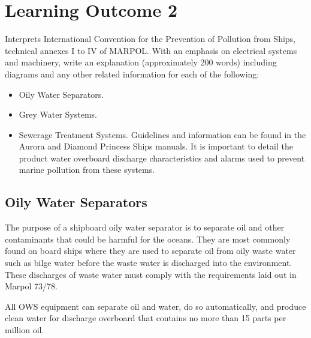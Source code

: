 \documentclass[11pt,a4paper]{article}
\begin{document}
\section{Learning Outcome 2}
\begin{tcolorbox}[colback=red!5!white,colframe=red!75!black,title=\textbf{Demonstrate knowledge of safe disposal of waste materials}]
Interprets International Convention for the Prevention of Pollution from Ships, technical annexes I to IV of MARPOL.
With an emphasis on electrical systems and machinery, write an explanation (approximately 200 words) including diagrams and any other related information for each of the following:
\begin{itemize}
\item Oily Water Separators.
\item Grey Water Systems.
\item Sewerage Treatment Systems.
Guidelines and information can be found in the Aurora and Diamond Princess Ships manuals. It is important to detail the product water overboard discharge characteristics and alarms used to prevent marine pollution from these systems.
\end{itemize}
\end{tcolorbox}
\subsection{Oily Water Separators}
The purpose of a shipboard oily water separator is to separate oil and other contaminants that could be harmful for the oceans. They are most commonly found on board ships where they are used to separate oil from oily waste water such as bilge water before the waste water is discharged into the environment. These discharges of waste water must comply with the requirements laid out in Marpol 73/78.

All OWS equipment can separate oil and water, do so automatically, and produce clean water for discharge overboard that contains no more than 15 parts per million oil.
\end{document}

